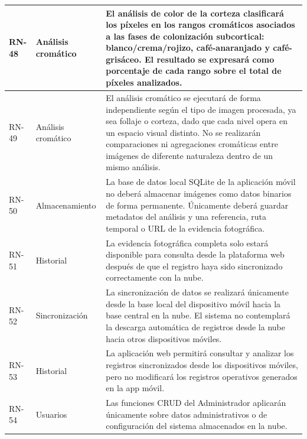 \begin{longtable}{|>{\centering\arraybackslash}m{1.8cm}|>{\centering\arraybackslash}m{2.5cm}|m{9.5cm}|}
\hline
RN-48 & Análisis cromático & El análisis de color de la corteza clasificará los píxeles en los rangos cromáticos asociados a las fases de colonización subcortical: blanco/crema/rojizo, café-anaranjado y café-grisáceo. El resultado se expresará como porcentaje de cada rango sobre el total de píxeles analizados. \\
\hline
RN-49 & Análisis cromático & El análisis cromático se ejecutará de forma independiente según el tipo de imagen procesada, ya sea follaje o corteza, dado que cada nivel opera en un espacio visual distinto. No se realizarán comparaciones ni agregaciones cromáticas entre imágenes de diferente naturaleza dentro de un mismo análisis. \\
\hline
RN-50 & Almacenamiento & La base de datos local SQLite de la aplicación móvil no deberá almacenar imágenes como datos binarios de forma permanente. Únicamente deberá guardar metadatos del análisis y una referencia, ruta temporal o URL de la evidencia fotográfica.\\
\hline
RN-51 & Historial & La evidencia fotográfica completa solo estará disponible para consulta desde la plataforma web después de que el registro haya sido sincronizado correctamente con la nube.\\
\hline
RN-52 & Sincronización & La sincronización de datos se realizará únicamente desde la base local del dispositivo móvil hacia la base central en la nube. El sistema no contemplará la descarga automática de registros desde la nube hacia otros dispositivos móviles.\\
\hline
RN-53 & Historial & La aplicación web permitirá consultar y analizar los registros sincronizados desde los dispositivos móviles, pero no modificará los registros operativos generados en la app móvil.\\
\hline
RN-54 & Usuarios & Las funciones CRUD del Administrador aplicarán únicamente sobre datos administrativos o de configuración del sistema almacenados en la nube.\\
\hline
\end{longtable}